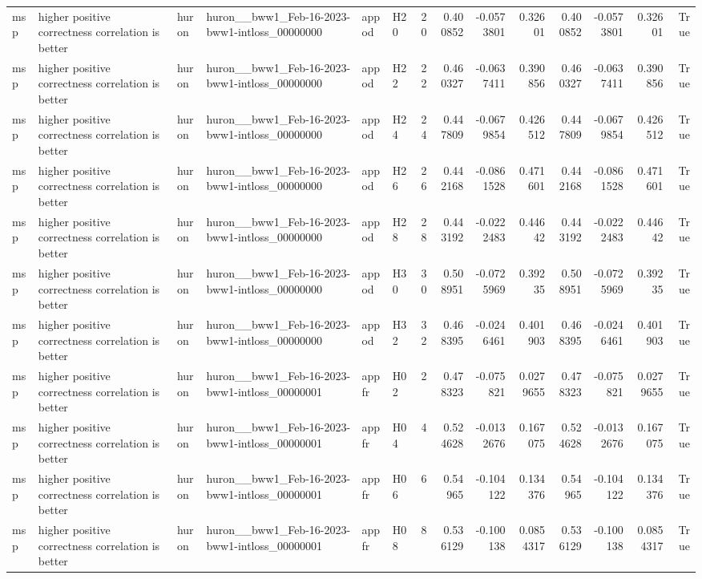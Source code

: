 \begin{longtable}{llllllrrrrrrrr}
msp & higher positive correctness correlation is better & huron & huron\_\_bww1\_Feb-16-2023-bww1-intloss\_00000000 & appod & H20 & 20 & 0.400852 & -0.0573801 & 0.32601 & 0.400852 & -0.0573801 & 0.32601 & True \\
msp & higher positive correctness correlation is better & huron & huron\_\_bww1\_Feb-16-2023-bww1-intloss\_00000000 & appod & H22 & 22 & 0.460327 & -0.0637411 & 0.390856 & 0.460327 & -0.0637411 & 0.390856 & True \\
msp & higher positive correctness correlation is better & huron & huron\_\_bww1\_Feb-16-2023-bww1-intloss\_00000000 & appod & H24 & 24 & 0.447809 & -0.0679854 & 0.426512 & 0.447809 & -0.0679854 & 0.426512 & True \\
msp & higher positive correctness correlation is better & huron & huron\_\_bww1\_Feb-16-2023-bww1-intloss\_00000000 & appod & H26 & 26 & 0.442168 & -0.0861528 & 0.471601 & 0.442168 & -0.0861528 & 0.471601 & True \\
msp & higher positive correctness correlation is better & huron & huron\_\_bww1\_Feb-16-2023-bww1-intloss\_00000000 & appod & H28 & 28 & 0.443192 & -0.0222483 & 0.44642 & 0.443192 & -0.0222483 & 0.44642 & True \\
msp & higher positive correctness correlation is better & huron & huron\_\_bww1\_Feb-16-2023-bww1-intloss\_00000000 & appod & H30 & 30 & 0.508951 & -0.0725969 & 0.39235 & 0.508951 & -0.0725969 & 0.39235 & True \\
msp & higher positive correctness correlation is better & huron & huron\_\_bww1\_Feb-16-2023-bww1-intloss\_00000000 & appod & H32 & 32 & 0.468395 & -0.0246461 & 0.401903 & 0.468395 & -0.0246461 & 0.401903 & True \\
msp & higher positive correctness correlation is better & huron & huron\_\_bww1\_Feb-16-2023-bww1-intloss\_00000001 & appfr & H02 & 2 & 0.478323 & -0.075821 & 0.0279655 & 0.478323 & -0.075821 & 0.0279655 & True \\
msp & higher positive correctness correlation is better & huron & huron\_\_bww1\_Feb-16-2023-bww1-intloss\_00000001 & appfr & H04 & 4 & 0.524628 & -0.0132676 & 0.167075 & 0.524628 & -0.0132676 & 0.167075 & True \\
msp & higher positive correctness correlation is better & huron & huron\_\_bww1\_Feb-16-2023-bww1-intloss\_00000001 & appfr & H06 & 6 & 0.54965 & -0.104122 & 0.134376 & 0.54965 & -0.104122 & 0.134376 & True \\
msp & higher positive correctness correlation is better & huron & huron\_\_bww1\_Feb-16-2023-bww1-intloss\_00000001 & appfr & H08 & 8 & 0.536129 & -0.100138 & 0.0854317 & 0.536129 & -0.100138 & 0.0854317 & True \\

\end{longtable}
